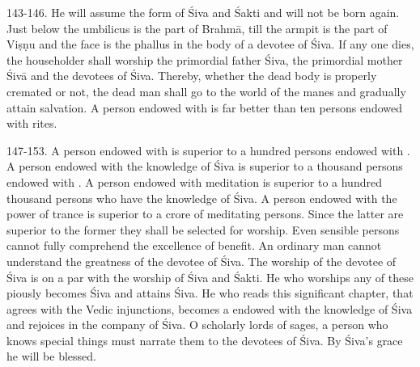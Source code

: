143-146. He will assume the form of Śiva and Śakti and will not be born again.
Just below the umbilicus is the part of Brahmā, till the armpit is the part of
Viṣṇu and the face is the phallus in the body of a devotee of Śiva. If any one
dies, the householder shall worship the primordial father Śiva, the primordial
mother Śivā and the devotees of Śiva. Thereby, whether the dead body is properly
cremated or not, the dead man shall go to the world of the manes and gradually
attain salvation. A person endowed with  is far better than ten
persons endowed with rites.

147-153. A person endowed with  is superior to a hundred persons
endowed with . A person endowed with the knowledge of Śiva is superior
to a thousand persons endowed with . A person endowed with meditation
is superior to a hundred thousand persons who have the knowledge of Śiva.
A person endowed with the power of trance is superior to a crore of meditating
persons. Since the latter are superior to the former they shall be selected for
worship. Even sensible persons cannot fully comprehend the excellence of
benefit. An ordinary man cannot understand the greatness of the devotee of Śiva.
The worship of the devotee of Śiva is on a par with the worship of Śiva and
Śakti. He who worships any of these piously becomes Śiva and attains Śiva. He
who reads this significant chapter, that agrees with the Vedic injunctions,
becomes a  endowed with the knowledge of Śiva and rejoices in
the company of Śiva. O scholarly lords of sages, a person who knows special
things must narrate them to the devotees of Śiva. By Śiva’s grace he will be
blessed.
